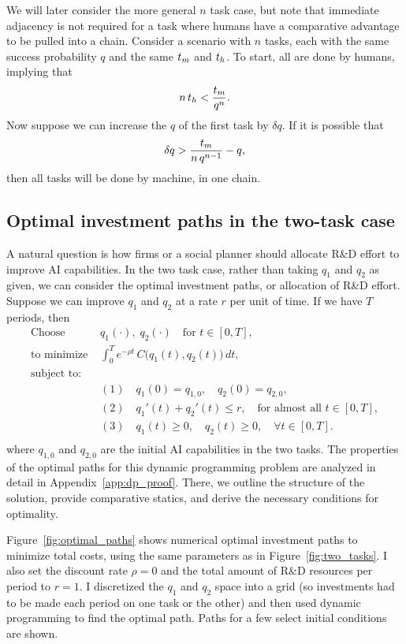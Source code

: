 \documentclass{article}
\theoremstyle{plain}
\theoremstyle{plain}
\begin{document}
We will later consider the more general \(n\) task case, but note that immediate adjacency is not required for a task where humans have a comparative advantage to be pulled into a chain.
Consider a scenario with \(n\) tasks, each with the same success probability \(q\) and the same \(t_{m}\) and \(t_{h}\).
To start, all are done by humans, implying that
\[
n\, t_{h} < \frac{t_{m}}{q^n}.
\]
Now suppose we can increase the \(q\) of the first task by \(\delta q\). 
If it is possible that  
\begin{align}
  \delta q > \frac{t_{m}}{n\, q^{n-1}} - q,
\end{align} 
then all tasks will be done by machine, in one chain.

\subsection{Optimal investment paths in the two-task case}
A natural question is how firms or a social planner should allocate R\&D effort to improve AI capabilities.
In the two task case, rather than taking \(q_1\) and \(q_2\) as given, we can consider the optimal investment paths, or allocation of R\&D effort.
Suppose we can improve \(q_1\) and \(q_2\) at a rate \(r\) per unit of time.
If we have \(T\) periods, then 
\[
\begin{aligned}
\text{Choose } &q_1(\cdot), \; q_2(\cdot) \quad \text{for } t \in [0, T],\\[1em]
\text{to minimize } &
   \int_{0}^{T}
   e^{-\rho t} \, C\bigl(q_1(t), q_2(t)\bigr) \, dt, \\[1em]
\text{subject to:} & \\[-1em]
&(1)\quad q_1(0) = q_{1,0}, \quad q_2(0) = q_{2,0}, \\[6pt]
&(2)\quad q_1'(t) + q_2'(t) \le r, \quad \text{for almost all } t \in [0, T], \\[6pt]
&(3)\quad q_1(t) \geq 0, \quad q_2(t) \geq 0, \quad \forall t \in [0, T]. \\[6pt]
\end{aligned}
\label{eq:dp_problem}
\]
where \(q_{1,0}\) and \(q_{2,0}\) are the initial AI capabilities in the two tasks.
The properties of the optimal paths for this dynamic programming problem are analyzed in detail in Appendix~\ref{app:dp_proof}. 
There, we outline the structure of the solution, provide comparative statics, and derive the necessary conditions for optimality.

Figure~\ref{fig:optimal_paths} shows numerical optimal investment paths to minimize total costs, using the same parameters as in Figure~\ref{fig:two_tasks}.
I also set the discount rate \(\rho = 0\) and the total amount of R\&D resources per period to \(r = 1\).
I discretized the \(q_1\) and \(q_2\) space into a grid (so investments had to be made each period on one task or the other) and then used dynamic programming to find the optimal path.
Paths for a few select initial conditions are shown.
\end{document}
